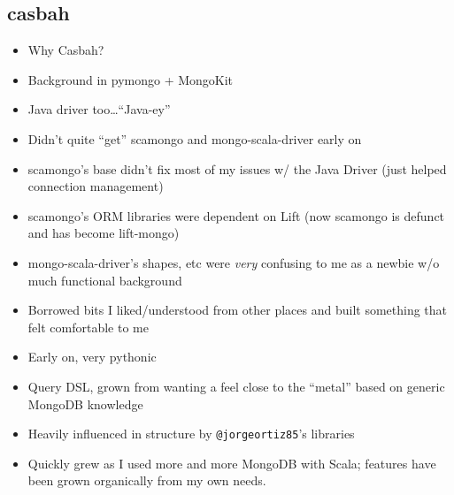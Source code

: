 \documentclass[xcolor=dvipsnames]{beamer}
\newenvironment{itemizeframe}
               {\begin{frame}\startitemizeframe} 
               {\stopitemizeframe\end{frame}}
\newcommand\startitemizeframe{\begin{itemize}} \newcommand\stopitemizeframe{\end{itemize}}
\begin{document}
\begin{itemizeframe}
\subsection{casbah}
\begin{itemizeframe}
    \frametitle{Shameless Self Promotion}
    \item Why Casbah?
	\item     Background in pymongo + MongoKit 

	\item     Java driver too\ldots ``Java-ey''

	\item     Didn't quite ``get'' scamongo and mongo-scala-driver early on

	\item     scamongo's base didn't fix most of my issues w/ the Java Driver (just helped connection management)

	\item     scamongo's ORM libraries were dependent on Lift (now scamongo is defunct and has become lift-mongo)

	\item     mongo-scala-driver's shapes, etc were \emph{very} confusing to me as a newbie w/o much functional background

\end{itemizeframe}

\begin{itemizeframe}
    \frametitle{Casbah is Born}
    \item Borrowed bits I liked/understood from other places and built something that felt comfortable to me 
    \item Early on, very pythonic
    \item Query DSL, grown from wanting a feel close to the ``metal'' based on generic MongoDB knowledge
    \item Heavily influenced in structure by \texttt{@jorgeortiz85}'s libraries
    \item Quickly grew as I used more and more MongoDB with Scala; features have been grown organically from my own needs.
\end{itemizeframe}


\end{itemizeframe}
\end{document}
